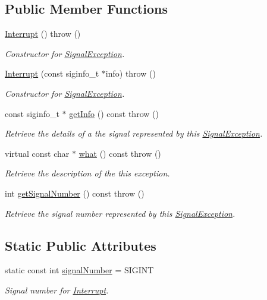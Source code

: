 \subsection*{\-Public \-Member \-Functions}
\begin{DoxyCompactItemize}
\item 
\hyperlink{classLibWheel_1_1Interrupt_a1aae086691cdc393008aaccab81c5adc}{\-Interrupt} ()  throw ()
\begin{DoxyCompactList}\small\item\em \-Constructor for \hyperlink{classLibWheel_1_1SignalException}{\-Signal\-Exception}. \end{DoxyCompactList}\item 
\hyperlink{classLibWheel_1_1Interrupt_a4679e7a5ebee81c4b619848d70026d50}{\-Interrupt} (const siginfo\-\_\-t $\ast$info)  throw ()
\begin{DoxyCompactList}\small\item\em \-Constructor for \hyperlink{classLibWheel_1_1SignalException}{\-Signal\-Exception}. \end{DoxyCompactList}\item 
const siginfo\-\_\-t $\ast$ \hyperlink{classLibWheel_1_1SignalException_a470409aa1db7608623c601c9bda573f4}{get\-Info} () const   throw ()
\begin{DoxyCompactList}\small\item\em \-Retrieve the details of a the signal represented by this \hyperlink{classLibWheel_1_1SignalException}{\-Signal\-Exception}. \end{DoxyCompactList}\item 
virtual const char $\ast$ \hyperlink{classLibWheel_1_1SignalException_a65ea3c23ec24f6448fb02624f9b039c2}{what} () const   throw ()
\begin{DoxyCompactList}\small\item\em \-Retrieve the description of the this exception. \end{DoxyCompactList}\item 
int \hyperlink{classLibWheel_1_1SignalException_a966b7c3d4054dd0a6c5121ae6d17d8cb}{get\-Signal\-Number} () const   throw ()
\begin{DoxyCompactList}\small\item\em \-Retrieve the signal number represented by this \hyperlink{classLibWheel_1_1SignalException}{\-Signal\-Exception}. \end{DoxyCompactList}\end{DoxyCompactItemize}
\subsection*{\-Static \-Public \-Attributes}
\begin{DoxyCompactItemize}
\item 
static const int \hyperlink{classLibWheel_1_1Interrupt_a73b379bb2504c68644a132100bc43c38}{signal\-Number} = \-S\-I\-G\-I\-N\-T
\begin{DoxyCompactList}\small\item\em \-Signal number for \hyperlink{classLibWheel_1_1Interrupt}{\-Interrupt}. \end{DoxyCompactList}\end{DoxyCompactItemize}


